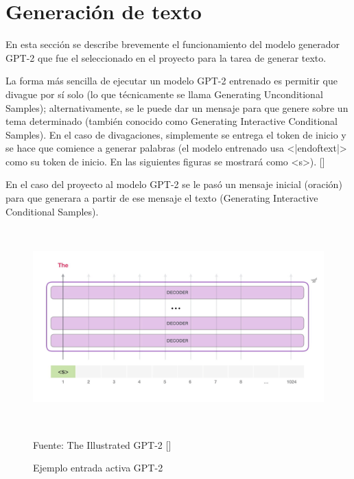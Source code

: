 \documentclass[../Main.tex]{subfiles}
\begin{document}
    \section{Generación de texto}
    
    \begin{justify}
    En esta sección se describe brevemente el funcionamiento del modelo generador GPT-2 que fue el seleccionado en el proyecto para la tarea de generar texto.
    
    La forma más sencilla de ejecutar un modelo GPT-2 entrenado es permitir que divague por sí solo (lo que técnicamente se llama Generating Unconditional Samples); alternativamente, se le puede dar un mensaje para que genere sobre un tema determinado (también conocido como Generating Interactive Conditional Samples). En el caso de divagaciones, simplemente se entrega el token de inicio y se hace que comience a generar palabras (el modelo entrenado usa <|endoftext|> como su token de inicio. En las siguientes figuras se mostrará como <s>). [] %
    
    En el caso del proyecto al modelo GPT-2 se le pasó un mensaje inicial (oración) para que generara a partir de ese mensaje el texto (Generating Interactive Conditional Samples).
    \end{justify}
    
    \begin{figure}[H]
	\begin{Center}
		\includegraphics[width=6in,height=3in]{Chapters/04ChapterModelamiento/images/gpt-2-layers-input-1.png}
	    \caption{Ejemplo entrada activa GPT-2}
	    Fuente: The Illustrated GPT-2 []
        \label{fig:section}
	\end{Center}
    \end{figure}
    
\end{document}
